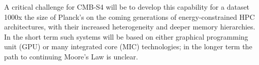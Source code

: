A critical challenge for CMB-S4 will be to develop this capability for a dataset 1000x the size of Planck's on the coming generations of energy-constrained HPC architectures, with their increased heterogeneity and deeper memory hierarchies. In the short term such systems will be based on either graphical programming unit (GPU) or many integrated core (MIC) technologies; in the longer term the path to continuing Moore's Law is unclear.

%



